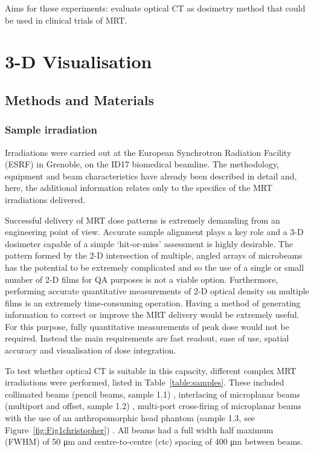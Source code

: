 	
	Aims for these experiments: evaluate optical CT as dosimetry method that could be used in clinical trials of MRT.
	
	\section{3-D Visualisation}
	\label{sec:3dvis}
	\subsection{Methods and Materials}
	
	
	\subsubsection{Sample irradiation}
	Irradiations were carried out at the European Synchrotron Radiation Facility (ESRF) in Grenoble, on the ID17 biomedical beamline. The methodology, equipment and beam characteristics have already been described in detail \cite{abdulrahmansophisticated2011 , doranestablishing2013 , doranan2010} and, here, the additional information relates only to the specifics of the MRT irradiations delivered. 
	
	Successful delivery of MRT dose patterns is extremely demanding from an engineering point of view. Accurate sample alignment plays a key role and a 3-D dosimeter capable of a simple `hit-or-miss' assessment is highly desirable. The pattern formed by the 2-D intersection of multiple, angled arrays of microbeams has the potential to be extremely complicated and so the use of a single or small number of 2-D films for QA purposes is not a viable option. Furthermore, performing accurate quantitative measurements of 2-D optical density on multiple films is an extremely time-consuming operation. Having a method of generating information to correct or improve the MRT delivery would be extremely useful. For this purpose, fully quantitative measurements of peak dose would not be required. Instead the main requirements are fast readout, ease of use, spatial accuracy and visualisation of dose integration. 
	
	To test whether optical CT is suitable in this capacity, different complex MRT irradiations were performed, listed in Table~\ref{table:samples}. These included collimated beams (pencil beams, sample 1.1) \cite{brauer-krischeffects2010}, interlacing of microplanar beams (multiport and offset, sample 1.2) \cite{serduchigh-precision2010}, multi-port cross-firing of microplanar beams with the use of an anthropomorphic head phantom (sample 1.3, see Figure~\ref{fig:Fig1christopher}) \cite{requardt2005new}. All beams had a full width half maximum (FWHM) of 50 \si{\um} and centre-to-centre (ctc) spacing of 400 \si{\um} between beams.
	
